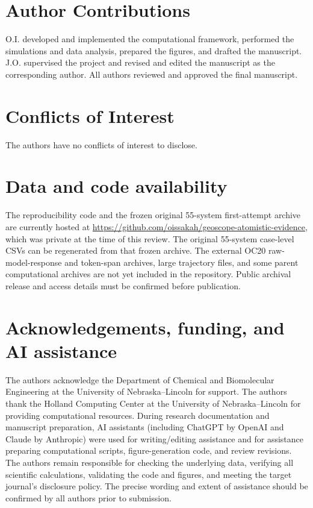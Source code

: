 \section*{Author Contributions}
O.I. developed and implemented the computational framework, performed the simulations and data analysis, prepared the figures, and drafted the manuscript. J.O. supervised the project and revised and edited the manuscript as the corresponding author. All authors reviewed and approved the final manuscript.


\section*{Conflicts of Interest}
The authors have no conflicts of interest to disclose.


\section*{Data and code availability}
The reproducibility code and the frozen original 55-system first-attempt archive are currently hosted at \url{https://github.com/oissakah/geoscope-atomistic-evidence}, which was private at the time of this review. The original 55-system case-level CSVs can be regenerated from that frozen archive. The external OC20 raw-model-response and token-span archives, large trajectory files, and some parent computational archives are not yet included in the repository. Public archival release and access details must be confirmed before publication. 


\section*{Acknowledgements, funding, and AI assistance}
The authors acknowledge the Department of Chemical and Biomolecular Engineering at the University of Nebraska--Lincoln for support. The authors thank the Holland Computing Center at the University of Nebraska--Lincoln for providing computational resources. During research documentation and manuscript preparation, AI assistants (including ChatGPT by OpenAI and Claude by Anthropic) were used for writing/editing assistance and for assistance preparing computational scripts, figure-generation code, and review revisions. The authors remain responsible for checking the underlying data, verifying all scientific calculations, validating the code and figures, and meeting the target journal's disclosure policy. The precise wording and extent of assistance should be confirmed by all authors prior to submission.